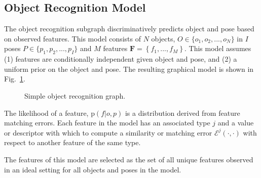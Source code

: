 \documentclass[conference]{IEEEtran}
\newcommand{\figref}[1]{Fig.~\ref{#1}}
\newcommand{\prob}[1]{\text{p}(#1)} %
\newcommand{\set}[1]{\mathbf{#1}} %
\newcommand{\cursive}[1]{\mathcal{#1}}
\begin{document}
    \subsection{Object Recognition Model}
        The object recognition subgraph discriminatively predicts object and pose based on observed features. This model consists of $N$ objects, $O \in \{o_1,o_2, ..., o_N\}$ in $I$ poses $P \in \{p_1,p_2, ..., p_I\}$ and 
        $M$ features $\set{F} = \left\{ f_1, ...,  f_M\right\}$. 
        This model assumes (1) features are conditionally independent given object and pose, and (2) a uniform prior on the object and pose. The resulting graphical model is shown in \figref{fig:objectRecognitionSubgraph}.
        \begin{figure}[h]
          \centering
          \caption{Simple object recognition graph.}
          \label{fig:objectRecognitionSubgraph}
        \end{figure}

        The likelihood of a feature, $\prob{f|o,p}$ is a distribution derived from feature matching errors. Each feature in the model has an associated type $j$ and a value or descriptor with which to compute a similarity or matching error $\cursive{E}^j(\cdot,\cdot)$ with respect to another feature of the same type.

        The features of this model are selected as the set of all unique features observed in an ideal setting for all objects and poses in the model. 

\end{document}
